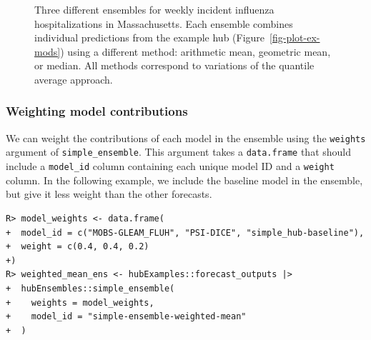 \documentclass[
  article,
  shortnames,
  notitle]{jss}
\begin{document}
\begin{figure}


\caption{\label{fig-plot-ensembles}Three different ensembles for weekly
incident influenza hospitalizations in Massachusetts. Each ensemble
combines individual predictions from the example hub
(Figure~\ref{fig-plot-ex-mods}) using a different method: arithmetic
mean, geometric mean, or median. All methods correspond to variations of
the quantile average approach.}

\end{figure}%

\subsubsection{Weighting model
contributions}\label{weighting-model-contributions}

We can weight the contributions of each model in the ensemble using the
\texttt{weights} argument of \texttt{simple\_ensemble}. This argument
takes a \texttt{data.frame} that should include a \texttt{model\_id}
column containing each unique model ID and a \texttt{weight} column. In
the following example, we include the baseline model in the ensemble,
but give it less weight than the other forecasts.

\begin{verbatim}
R> model_weights <- data.frame(
+  model_id = c("MOBS-GLEAM_FLUH", "PSI-DICE", "simple_hub-baseline"),
+  weight = c(0.4, 0.4, 0.2)
+)
R> weighted_mean_ens <- hubExamples::forecast_outputs |>
+  hubEnsembles::simple_ensemble(
+    weights = model_weights,
+    model_id = "simple-ensemble-weighted-mean"
+  )
\end{verbatim}
\end{document}
